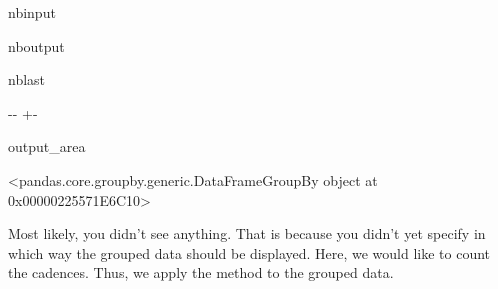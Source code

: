 \documentclass[letterpaper,10pt,english]{sphinxmanual}
\newlength\nbsphinxcodecellspacing
\begin{document}
\begin{sphinxuseclass}{nbinput}
{
\begin{sphinxVerbatim}[commandchars=\\\{\}]
\llap{\color{nbsphinxin}[25]:\,\hspace{\fboxrule}\hspace{\fboxsep}}
\end{sphinxVerbatim}
}

\end{sphinxuseclass}
\begin{sphinxuseclass}{nboutput}
\begin{sphinxuseclass}{nblast}
{

\kern-\sphinxverbatimsmallskipamount\kern-\baselineskip
\kern+\FrameHeightAdjust\kern-\fboxrule
\vspace{\nbsphinxcodecellspacing}

\begin{sphinxuseclass}{output_area}
\begin{sphinxuseclass}{}


\begin{sphinxVerbatim}[commandchars=\\\{\}]
\llap{\color{nbsphinxout}[25]:\,\hspace{\fboxrule}\hspace{\fboxsep}}<pandas.core.groupby.generic.DataFrameGroupBy object at 0x00000225571E6C10>
\end{sphinxVerbatim}



\end{sphinxuseclass}
\end{sphinxuseclass}
}

\end{sphinxuseclass}
\end{sphinxuseclass}
\sphinxAtStartPar
Most likely, you didn’t see anything. That is because you didn’t yet specify in which way the grouped data should be displayed. Here, we would like to count the cadences. Thus, we apply the  method to the grouped data.
\end{document}
